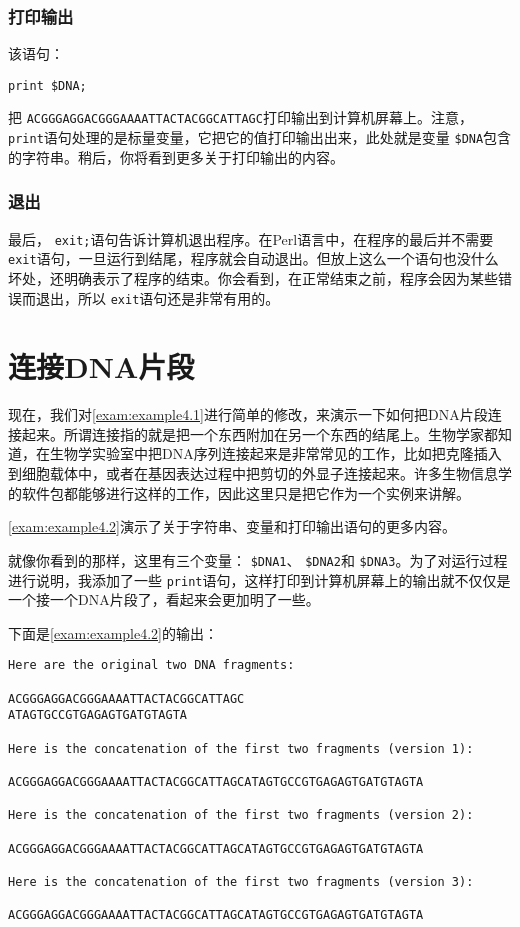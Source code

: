\subsubsection{打印输出}
该语句：

\begin{lstlisting}
print $DNA;
\end{lstlisting}
把 \verb|ACGGGAGGACGGGAAAATTACTACGGCATTAGC|打印输出到计算机屏幕上。注意， \verb|print|语句处理的是标量变量，它把它的值打印输出出来，此处就是变量 \verb|$DNA|包含的字符串。稍后，你将看到更多关于打印输出的内容。

\subsubsection{退出}
最后， \verb|exit;|语句告诉计算机退出程序。在Perl语言中，在程序的最后并不需要 \verb|exit|语句，一旦运行到结尾，程序就会自动退出。但放上这么一个语句也没什么坏处，还明确表示了程序的结束。你会看到，在正常结束之前，程序会因为某些错误而退出，所以 \verb|exit|语句还是非常有用的。

\section{连接DNA片段}
现在，我们对\autoref{exam:example4.1}进行简单的修改，来演示一下如何把DNA片段连接起来。所谓连接指的就是把一个东西附加在另一个东西的结尾上。生物学家都知道，在生物学实验室中把DNA序列连接起来是非常常见的工作，比如把克隆插入到细胞载体中，或者在基因表达过程中把剪切的外显子连接起来。许多生物信息学的软件包都能够进行这样的工作，因此这里只是把它作为一个实例来讲解。

\autoref{exam:example4.2}演示了关于字符串、变量和打印输出语句的更多内容。



就像你看到的那样，这里有三个变量： \verb|$DNA1|、 \verb|$DNA2|和 \verb|$DNA3|。为了对运行过程进行说明，我添加了一些 \verb|print|语句，这样打印到计算机屏幕上的输出就不仅仅是一个接一个DNA片段了，看起来会更加明了一些。

下面是\autoref{exam:example4.2}的输出：

\begin{lstlisting}
Here are the original two DNA fragments:

ACGGGAGGACGGGAAAATTACTACGGCATTAGC
ATAGTGCCGTGAGAGTGATGTAGTA

Here is the concatenation of the first two fragments (version 1):

ACGGGAGGACGGGAAAATTACTACGGCATTAGCATAGTGCCGTGAGAGTGATGTAGTA

Here is the concatenation of the first two fragments (version 2):

ACGGGAGGACGGGAAAATTACTACGGCATTAGCATAGTGCCGTGAGAGTGATGTAGTA

Here is the concatenation of the first two fragments (version 3):

ACGGGAGGACGGGAAAATTACTACGGCATTAGCATAGTGCCGTGAGAGTGATGTAGTA
\end{lstlisting}

